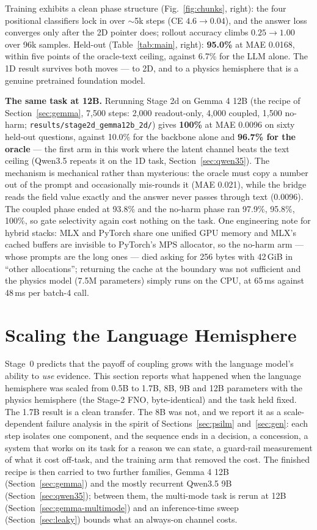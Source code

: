 \documentclass[11pt]{article}
\newcommand{\code}[1]{\texttt{#1}}
\begin{document}
Training exhibits a clean phase structure (Fig.~\ref{fig:chunks}, right): the four positional classifiers lock in over $\sim$5k steps (CE $4.6\!\to\!0.04$), and the answer loss converges only after the 2D pointer does; rollout accuracy climbs $0.25 \to 1.00$ over 96k samples. Held-out (Table~\ref{tab:main}, right): \textbf{95.0\%} at MAE 0.0168, within five points of the oracle-text ceiling, against 6.7\% for the LLM alone. The 1D result survives both moves --- to 2D, and to a physics hemisphere that is a genuine pretrained foundation model.

\textbf{The same task at 12B.} Rerunning Stage 2d on Gemma 4 12B (the recipe of Section~\ref{sec:gemma}, 7,500 steps: 2,000 readout-only, 4,000 coupled, 1,500 no-harm; \code{results/stage2d\_gemma12b\_2d/}) gives \textbf{100\%} at MAE 0.0096 on sixty held-out questions, against 10.0\% for the backbone alone and \textbf{96.7\% for the oracle} --- the first arm in this work where the latent channel beats the text ceiling (Qwen3.5 repeats it on the 1D task, Section~\ref{sec:qwen35}). The mechanism is mechanical rather than mysterious: the oracle must copy a number out of the prompt and occasionally mis-rounds it (MAE 0.021), while the bridge reads the field value exactly and the answer never passes through text (0.0096). The coupled phase ended at 93.8\% and the no-harm phase ran 97.9\%, 95.8\%, 100\%, so gate selectivity again cost nothing on the task. One engineering note for hybrid stacks: MLX and PyTorch share one unified GPU memory and MLX's cached buffers are invisible to PyTorch's MPS allocator, so the no-harm arm --- whose prompts are the long ones --- died asking for 256 bytes with 42\,GiB in ``other allocations''; returning the cache at the boundary was not sufficient and the physics model (7.5M parameters) simply runs on the CPU, at 65\,ms against 48\,ms per batch-4 call.

\section{Scaling the Language Hemisphere}
\label{sec:scaling}

Stage~0 predicts that the payoff of coupling grows with the language model's ability to \emph{use} evidence. This section reports what happened when the language hemisphere was scaled from 0.5B to 1.7B, 8B, 9B and 12B parameters with the physics hemisphere (the Stage-2 FNO, byte-identical) and the task held fixed. The 1.7B result is a clean transfer. The 8B was not, and we report it as a scale-dependent failure analysis in the spirit of Sections~\ref{sec:psilm} and~\ref{sec:gen}: each step isolates one component, and the sequence ends in a decision, a concession, a system that works on its task for a reason we can state, a guard-rail measurement of what it cost off-task, and the training arm that removed the cost. The finished recipe is then carried to two further families, Gemma 4 12B (Section~\ref{sec:gemma}) and the mostly recurrent Qwen3.5 9B (Section~\ref{sec:qwen35}); between them, the multi-mode task is rerun at 12B (Section~\ref{sec:gemma-multimode}) and an inference-time sweep (Section~\ref{sec:leaky}) bounds what an always-on channel costs.
\end{document}
